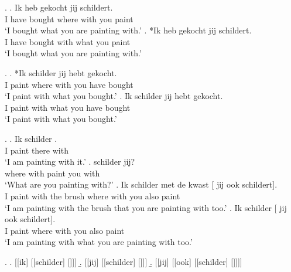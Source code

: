 \documentclass[xcolor=dvipsnames,10pt]{beamer}
\begin{document}
\begin{frame}

\ex.
\ag. Ik heb gekocht   jij schildert.\\
 I have bought where with you paint\\
 `I bought what you are painting with.'\label{ex:gekochtwaar-mee}
\bg. *Ik heb gekocht   jij schildert.\\
 I have bought with what you paint\\
 `I bought what you are painting with.'\label{ex:gekochtmetwat}

\pause

\ex.\label{ex:schildermet}
\ag. *Ik schilder   jij hebt gekocht.\\
 I paint where with you have bought\\
 `I paint with what you bought.'\label{ex:schilderwaar-mee}
\bg. Ik schilder   jij hebt gekocht.\\
 I paint with what you have bought\\
 `I paint with what you bought.'\label{ex:schildermetwat}


\end{frame}


\begin{frame}

\ex.
\ag. Ik schilder  .\\
 I paint there with\\
 `I am painting with it.'\label{ex:const1}
\bg.   schilder jij?\\
where with paint you with\\
 `What are you painting with?'\label{ex:const2}
\bg. Ik schilder met de kwast [  jij ook schildert].\\
 I paint with the brush where with you also paint\\
 `I am painting with the brush that you are painting with too.'\label{ex:const3}
\bg. Ik schilder [  jij ook schildert].\\
 I paint where with you also paint\\
 `I am painting with what you are painting with too.'\label{ex:const4}

\pause

\ex.
\a. [[ik] [[schilder] []]]\label{ex:const1stage}
\b. [[jij] [[schilder] []]]\label{ex:const2stage}
\b. [[jij] [[ook] [[schilder] []]]]\label{ex:const3stage}

\end{frame}
\end{document}
